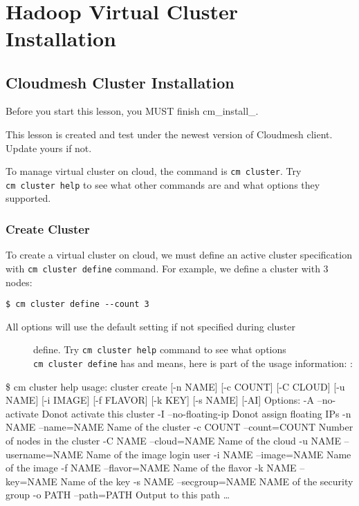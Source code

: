 \FILENAME\
\section{Hadoop Virtual Cluster
Installation}\label{hadoop-virtual-cluster-installation}

\subsection{Cloudmesh Cluster
Installation}\label{cloudmesh-cluster-installation}

Before you start this lesson, you MUST finish cm\_install\_.

This lesson is created and test under the newest version of Cloudmesh
client. Update yours if not.

To manage virtual cluster on cloud, the command is \texttt{cm\ cluster}.
Try \texttt{cm\ cluster\ help} to see what other commands are and what
options they supported.

\subsubsection{Create Cluster}\label{create-cluster}

To create a virtual cluster on cloud, we must define an active cluster
specification with \texttt{cm\ cluster\ define} command. For example, we
define a cluster with 3 nodes:

\begin{verbatim}
$ cm cluster define --count 3
\end{verbatim}

\begin{description}
\item[All options will use the default setting if not specified during
cluster]
define. Try \texttt{cm\ cluster\ help} command to see what options
\texttt{cm\ cluster\ define} has and means, here is part of the usage
information: :
\end{description}

\$ cm cluster help usage: cluster create {[}-n NAME{]} {[}-c COUNT{]}
{[}-C CLOUD{]} {[}-u NAME{]} {[}-i IMAGE{]} {[}-f FLAVOR{]} {[}-k KEY{]}
{[}-s NAME{]} {[}-AI{]} Options: -A --no-activate Donot activate this
cluster -I --no-floating-ip Donot assign floating IPs -n NAME
--name=NAME Name of the cluster -c COUNT --count=COUNT Number of nodes
in the cluster -C NAME --cloud=NAME Name of the cloud -u NAME
--username=NAME Name of the image login user -i NAME --image=NAME Name
of the image -f NAME --flavor=NAME Name of the flavor -k NAME --key=NAME
Name of the key -s NAME --secgroup=NAME NAME of the security group -o
PATH --path=PATH Output to this path \ldots{}

